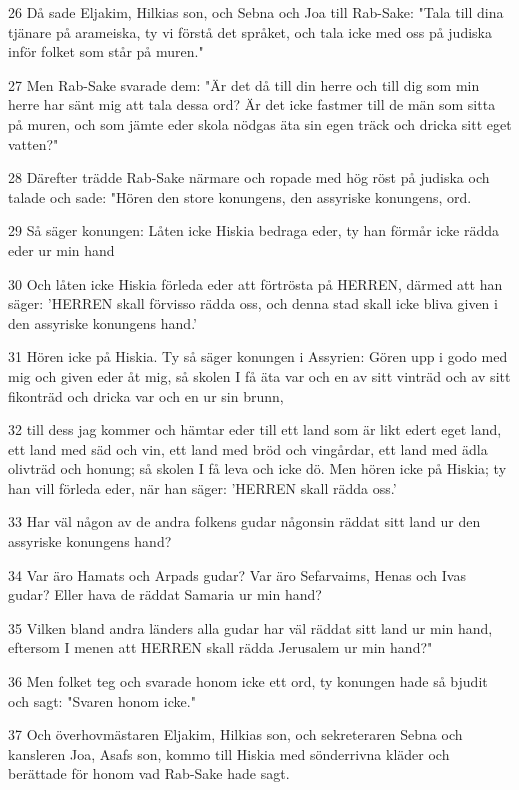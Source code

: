 \par 26 Då sade Eljakim, Hilkias son, och Sebna och Joa till Rab-Sake: "Tala till dina tjänare på arameiska, ty vi förstå det språket, och tala icke med oss på judiska inför folket som står på muren."
\par 27 Men Rab-Sake svarade dem: "Är det då till din herre och till dig som min herre har sänt mig att tala dessa ord? Är det icke fastmer till de män som sitta på muren, och som jämte eder skola nödgas äta sin egen träck och dricka sitt eget vatten?"
\par 28 Därefter trädde Rab-Sake närmare och ropade med hög röst på judiska och talade och sade: "Hören den store konungens, den assyriske konungens, ord.
\par 29 Så säger konungen: Låten icke Hiskia bedraga eder, ty han förmår icke rädda eder ur min hand
\par 30 Och låten icke Hiskia förleda eder att förtrösta på HERREN, därmed att han säger: 'HERREN skall förvisso rädda oss, och denna stad skall icke bliva given i den assyriske konungens hand.'
\par 31 Hören icke på Hiskia. Ty så säger konungen i Assyrien: Gören upp i godo med mig och given eder åt mig, så skolen I få äta var och en av sitt vinträd och av sitt fikonträd och dricka var och en ur sin brunn,
\par 32 till dess jag kommer och hämtar eder till ett land som är likt edert eget land, ett land med säd och vin, ett land med bröd och vingårdar, ett land med ädla olivträd och honung; så skolen I få leva och icke dö. Men hören icke på Hiskia; ty han vill förleda eder, när han säger: 'HERREN skall rädda oss.'
\par 33 Har väl någon av de andra folkens gudar någonsin räddat sitt land ur den assyriske konungens hand?
\par 34 Var äro Hamats och Arpads gudar? Var äro Sefarvaims, Henas och Ivas gudar? Eller hava de räddat Samaria ur min hand?
\par 35 Vilken bland andra länders alla gudar har väl räddat sitt land ur min hand, eftersom I menen att HERREN skall rädda Jerusalem ur min hand?"
\par 36 Men folket teg och svarade honom icke ett ord, ty konungen hade så bjudit och sagt: "Svaren honom icke."
\par 37 Och överhovmästaren Eljakim, Hilkias son, och sekreteraren Sebna och kansleren Joa, Asafs son, kommo till Hiskia med sönderrivna kläder och berättade för honom vad Rab-Sake hade sagt.

